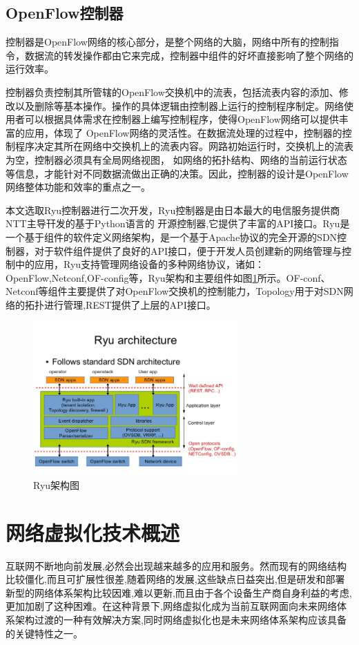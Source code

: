 \subsection{OpenFlow控制器}
控制器是OpenFlow网络的核心部分，是整个网络的大脑，网络中所有的控制指令，数据流的转发操作都由它来完成，控制器中组件的好坏直接影响了整个网络的运行效率。

控制器负责控制其所管辖的OpenFlow交换机中的流表，包括流表内容的添加、修改以及删除等基本操作。操作的具体逻辑由控制器上运行的控制程序制定。网络使用者可以根据具体需求在控制器上编写控制程序，使得OpenFlow网络可以提供丰富的应用，体现了 OpenFlow网络的灵活性。在数据流处理的过程中，控制器的控制程序决定其所在网络中交换机上的流表内容。网路初始运行时，交换机上的流表为空，控制器必须具有全局网络视图， 如网络的拓扑结构、网络的当前运行状态等信息，才能针对不同数据流做出正确的决策。因此，控制器的设计是OpenFlow网络整体功能和效率的重点之一。

本文选取Ryu控制器进行二次开发，Ryu控制器是由日本最大的电信服务提供商NTT主导幵发的基于Python语言的
开源控制器,它提供了丰富的API接口。Ryu是一个基于组件的软件定义网络架构，是一个基于Apache协议的完全开源的SDN控制器，对于软件组件提供了良好的API接口，便于开发人员创建新的网络管理与控制中的应用，Ryu支持管理网络设备的多种网络协议，诸如：OpenFlow,Netconf,OF-config等，Ryu架构和主要组件如图\ref{fig:ryu}所示。OF-conf、Netconf等组件主要提供了对OpenFlow交换机的控制能力，Topology用于对SDN网络的拓扑进行管理,REST提供了上层的API接口。

\begin{figure}[!htb]
  \centering
  \includegraphics[width=0.7\textwidth]{logo/ryu.jpg}
  \caption{Ryu架构图}
  \label{fig:ryu}
\end{figure}

\section{网络虚拟化技术概述}
互联网不断地向前发展,必然会出现越来越多的应用和服务。然而现有的网络结构比较僵化,而且可扩展性很差,随着网络的发展,这些缺点日益突出,但是研发和部署新型的网络体系架构比较因难,难以更新,而且由于各个设备生产商自身利益的考虑,更加加剧了这种困难。在这种背景下,网络虚拟化成为当前互联网面向未来网络体系架构过渡的一种有效解决方案,同时网络虚拟化也是未来网络体系架构应该具备的关键特性之一。

